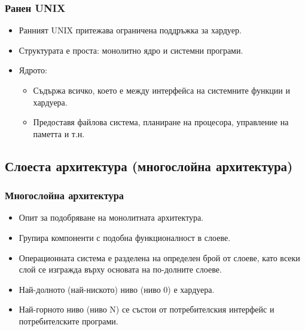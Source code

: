 \documentclass[ignorenonframetext, hyperref=unicode]{beamer}
\begin{document}
\begin{frame}
\frametitle{Ранен UNIX}
\begin{itemize}
\item Ранният UNIX притежава ограничена поддръжка за хардуер.
\item Структурата е проста: монолитно ядро и системни програми.
\item Ядрото:
\begin{itemize}
  \item Съдържа всичко, което е между интерфейса на системните функции и
  хардуера.
  \item Предоставя файлова система, планиране на процесора, управление на
  паметта и т.н.
\end{itemize}
\end{itemize}
\end{frame}

\subsection{Слоеста архитектура (многослойна архитектура)}

\begin{frame}
\frametitle{Многослойна архитектура}
\begin{itemize}
\item Опит за подобряване на монолитната архитектура.
\item Групира компоненти с подобна функционалност в слоеве.
\item Операционната система е разделена на определен брой от слоеве, като всеки
слой се изгражда върху основата на по-долните слоеве.
\item Най-долното (най-ниското) ниво (ниво 0) е хардуера.
\item Най-горното ниво (ниво N) се състои от потребителския интерфейс и
потребителските програми.
\end{itemize}
\end{frame}
\end{document}

